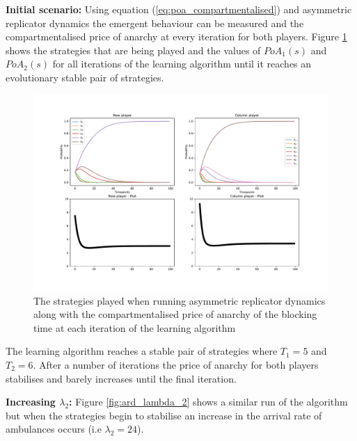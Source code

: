 \textbf{Initial scenario:}
Using equation (\ref{eq:poa_compartmentalised}) and asymmetric replicator 
dynamics the emergent behaviour can be measured and the compartmentalised price 
of anarchy at every iteration for both players.
Figure \ref{fig:ard_original} shows the strategies that are being played and 
the values of \(PoA_1(s)\) and \(PoA_2(s)\) for all iterations of the 
learning algorithm until it reaches an evolutionary stable pair of strategies.

\begin{figure}[H]
    \includegraphics[width=\textwidth]{imgs/asymmetric_rd_and_PoA/asymmetric_original.pdf}
    \caption{The strategies played when running asymmetric replicator dynamics
    along with the compartmentalised price of anarchy of the blocking time at
    each iteration of the learning algorithm}
    \label{fig:ard_original}
\end{figure}

The learning algorithm reaches a stable pair of 
strategies where \(T_1 = 5\) and \(T_2 = 6\). After a number of iterations the
price of anarchy for both players stabilises and barely increases until the 
final iteration. 

\textbf{Increasing \(\lambda_2\):}
Figure \ref{fig:ard_lambda_2} shows a similar run of the
algorithm but when the strategies begin to stabilise an increase in the
arrival rate of ambulances occurs (i.e \( \lambda_2 = 24 \)).


